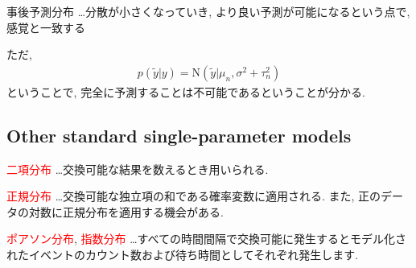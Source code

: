 \documentclass[11pt,a4pape,dvipdfmx]{jarticle}
\newcommand{\eq}[1]{\begin{align}#1\end{align}}
\newcommand{\tcr}[1]{\textcolor{red}{#1}}
\begin{document}
\begin{itembox}[l]{事後予測分布}
…分散が小さくなっていき, より良い予測が可能になるという点で, 感覚と一致する
\end{itembox}

ただ,
\eq{p(\tilde{y}|y)=\text{N}(\tilde{y}|\mu_n,\sigma^2+\tau^2_n)}
ということで, 完全に予測することは不可能であるということが分かる.


\subsection{Other standard single-parameter models}
\begin{itembox}[l]{\tcr{二項分布}}
…交換可能な結果を数えるとき用いられる.
\end{itembox}


\begin{itembox}[l]{\tcr{正規分布}}
…交換可能な独立項の和である確率変数に適用される.
また, 正のデータの対数に正規分布を適用する機会がある.
\end{itembox}


\begin{itembox}[l]{\tcr{ポアソン分布}, \tcr{指数分布}}
…すべての時間間隔で交換可能に発生するとモデル化されたイベントのカウント数および待ち時間としてそれぞれ発生します.
\end{itembox}
\end{document}
